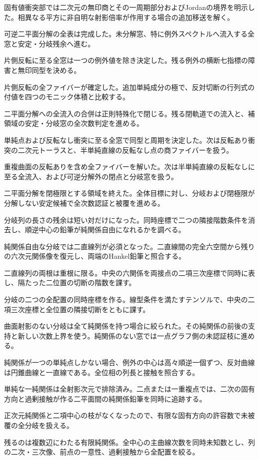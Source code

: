 \documentclass[11pt,a4paper]{ltjsarticle}
\begin{document}
固有値衝突部では二次元の無印商とその一周期部分およびJordanの境界を明示した。相異なる平方に非自明な射影倍率が作用する場合の追加移送を解く。

可逆二平面分解の全表は完成した。未分解窓、特に例外スペクトルへ流入する全窓と安定・分岐残余へ進む。

片側反転に至る全窓は一つの例外値を除き決定した。残る例外の横断七指標の障害と無印同型を決める。

片側反転の全ファイバーが確定した。追加単純成分の極で、反対切断の行列式の付値を四つのモニック体積と比較する。

二平面分解への全流入の合併は正則特殊化で閉じる。残る閉軌道での流入と、補領域の安定・分岐窓の全次数判定を進める。

単純点および反転なし衝突に至る全窓で同型と周期を決定した。次は反転あり衝突の二次元トーラスと、半単純直線の反転なし点の商ファイバーを扱う。

重複曲面の反転ありを含め全ファイバーを解いた。次は半単純直線の反転なしに至る全流入、および可逆分解外の閉点と分岐窓を扱う。

二平面分解を閉極限とする領域を終えた。全体目標に対し、分岐および閉極限が分解しない安定候補で全次数認証と被覆を進める。

分岐列の長さの残余は短い対だけになった。同時座標で二つの隣接階数条件を消去し、順逆中心の鉛筆が純関係自由になれるかを調べる。

純関係自由な分岐では二直線列が必須となった。二直線間の完全六空間から残りの六次元関係像を復元し、両端のHankel鉛筆と照合する。

二直線列の両根は重根に限る。中央の六関係を両接点の二項三次座標で同時に表し、隔たった二位置の切断の階数を課す。

分岐の二つの全配置の同時座標を作る。線型条件を満たすテンソルで、中央の二項三次座標と全位置の隣接切断をともに課す。

曲面射影のない分岐は全て純関係を持つ場合に絞られた。その純関係の前後の支持と新しい次数上界を使う。純関係のない窓では一点グラフ側の未認証枝に進める。

純関係が一つの単純点しかない場合、例外の中心は高々順逆一個ずつ、反対曲線は円錐曲線と一直線である。全位相の列長と接触を照合する。

単純な一純関係は全射影次元で排除済み。二点または一重複点では、二次の固有方向と過剰接触が作る二平面間の純関係鉛筆を同時に追跡する。

正次元純関係と二項中心の枝がなくなったので、有限な固有方向の許容数で未被覆の全分岐を扱える。

残るのは複数辺にわたる有限純関係。全中心の主曲線次数を同時未知数とし、列の二次・三次像、前点の一意性、過剰接触から全配置を絞る。
\end{document}
